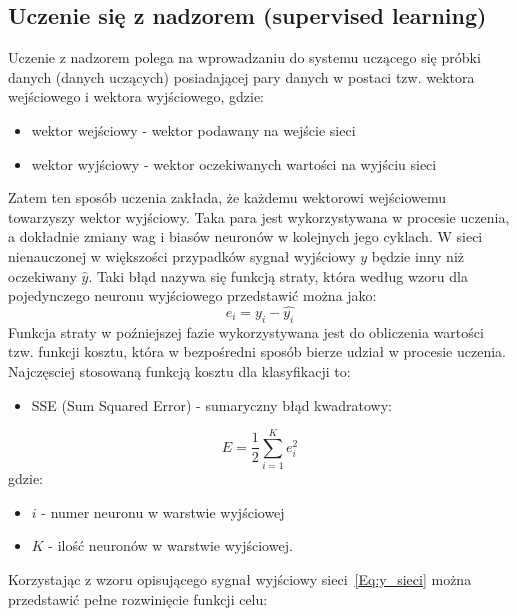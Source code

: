 \documentclass[12pt,twoside]{article}
\begin{document}
\subsection{Uczenie się z nadzorem (supervised learning)}
Uczenie z nadzorem polega na wprowadzaniu do systemu uczącego się próbki danych (danych uczących) posiadającej pary danych w postaci tzw. wektora wejściowego i wektora wyjściowego, gdzie:
\begin{itemize}
	\setlength\itemsep{0em}
	\setlength{\parskip}{0pt}
	\item wektor wejściowy - wektor podawany na wejście sieci
	\item wektor wyjściowy - wektor oczekiwanych wartości na wyjściu sieci
\end{itemize}
Zatem ten sposób uczenia zakłada, że każdemu wektorowi wejściowemu towarzyszy wektor wyjściowy. Taka para jest wykorzystywana w procesie uczenia, a dokładnie zmiany wag i biasów neuronów w kolejnych jego cyklach.
W sieci nienauczonej w większości przypadków sygnał wyjściowy $y$ będzie inny niż oczekiwany $\hat{y}$. Taki błąd nazywa się funkcją straty, która według wzoru dla pojedynczego neuronu wyjściowego przedstawić można jako:
\begin{equation}
	e_{i}=y_{i}-\hat{y_{i}}
\end{equation}
Funkcja straty w poźniejszej fazie wykorzystywana jest do obliczenia wartości tzw. funkcji kosztu, która w bezpośredni sposób bierze udział w procesie uczenia. Najczęsciej stosowaną funkcją kosztu dla klasyfikacji to:
\begin{itemize}
	\item SSE (Sum Squared Error) - sumaryczny błąd kwadratowy:
\end{itemize}
\begin{equation}
	E = \frac{1}{2} \sum_{i=1}^{K} e_{i}^{2}
\end{equation}
gdzie:
\begin{itemize}
	\setlength\itemsep{0em}
	\setlength{\parskip}{0pt}
	\item $i$ - numer neuronu w warstwie wyjściowej
	\item $K$ - ilość neuronów w warstwie wyjściowej.
\end{itemize}
Korzystając z wzoru opisującego sygnał wyjściowy sieci~\ref{Eq:y_sieci} można przedstawić pełne rozwinięcie funkcji celu:
\end{document}
